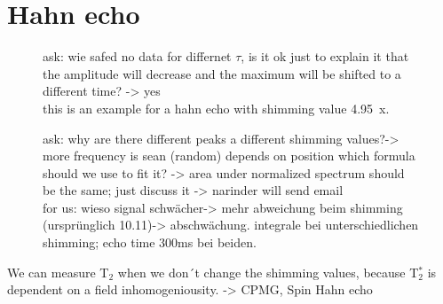 \section{Hahn echo}
\label{sec:Hahnecho}



\begin{figure}[H]
    \centering
    
    \caption[]{ask: wie safed no data for differnet $\tau$, is it ok just to explain it that the amplitude will decrease and the maximum will be shifted to a different time? -> yes\\
    
    this is an example for a hahn echo with shimming value \SI{4.95}{x}.}
    \label{fig:Echobeispeilsignal}
\end{figure}
\begin{figure}[H]
    \centering
    
    \caption[]{ask: why are there different peaks a different shimming values?-> more frequency is sean (random) depends on position\newline
    which formula should we use to fit it? -> area under normalized spectrum should be the same; just discuss it -> narinder will send email\\
    
    for us: wieso signal schwächer-> mehr abweichung beim shimming (ursprünglich 10.11)-> abschwächung. integrale bei unterschiedlichen shimming; echo time 300ms bei beiden. }
    \label{fig:SpinEcho}
\end{figure}
We can measure T$_2$ when we don´t change the shimming values, because T$_2^*$ is dependent on a field inhomogeniousity. -> CPMG, Spin Hahn echo
